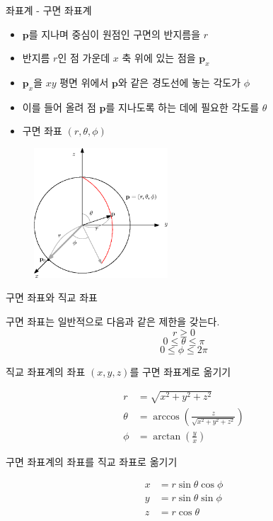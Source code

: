 \begin{frame}{좌표계 - 구면 좌표계}

\begin{itemize}
\item $\mathbf p$를 지나며 중심이 원점인 구면의 반지름을 $r$
\item 반지름 $r$인 점 가운데  $x$ 축 위에 있는 점을 $\mathbf p_x$
\item $\mathbf p_x$을 $xy$ 평면 위에서 $\mathbf p$와 같은 경도선에 놓는 각도가 $\phi$
\item 이를 들어 올려 점 $\mathbf p$를 지나도록 하는 데에 필요한 각도를 $\theta$
\item 구면 좌표 $(r, \theta, \phi)$
\end{itemize}

\begin{figure}
    \includegraphics[width=5cm]{Math_transform/sphericalCoord.eps}
\end{figure}

\end{frame}

\begin{frame}{구면 좌표와 직교 좌표}

{\small
구면 좌표는 일반적으로 다음과 같은 제한을 갖는다.
$$r \geq 0$$
$$0 \leq \theta \leq \pi$$
$$0 \leq \phi \leq 2 \pi $$

직교 좌표계의 좌표 $(x,y,z)$를 구면 좌표계로 옮기기

\begin{eqnarray}
r &= \sqrt{x^2 + y^2 + z^2} \nonumber \\
\theta & = \arccos \left ( \frac{z}{\sqrt{x^2 + y^2 + z^2}} \right ) \nonumber \\
\phi &= \arctan \left ( \frac{y}{x} \right ) \nonumber
\end{eqnarray}

구면 좌표계의 좌표를 직교 좌표로 옮기기

\begin{eqnarray}
x &= r \sin \theta \cos \phi \nonumber \\
y & = r \sin \theta \sin \phi \nonumber \\
z & =r \cos \theta \nonumber
\end{eqnarray}
}

\end{frame}


